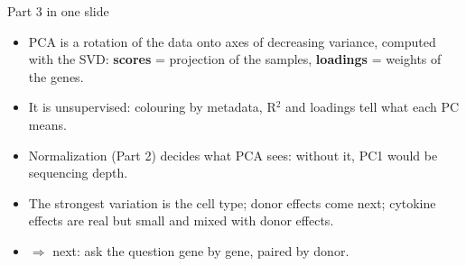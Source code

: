 \begin{frame}{Part 3 in one slide}
  \begin{itemize}\setlength\itemsep{7pt}
    \item PCA is a \alert{rotation} of the data onto axes of decreasing variance, computed with the \alert{SVD}: \textbf{scores} = projection of the samples, \textbf{loadings} = weights of the genes.
    \item It is \alert{unsupervised}: colouring by metadata, R$^2$ and loadings tell what each PC means.
    \item \alert{Normalization} (Part 2) decides what PCA sees: without it, PC1 would be sequencing depth.
    \item The strongest variation is the \alert{cell type}; donor effects come next; cytokine effects are real but small and \alert{mixed with donor effects}.
    \item $\Rightarrow$ next: ask the question gene by gene, paired by donor.
  \end{itemize}
\end{frame}
